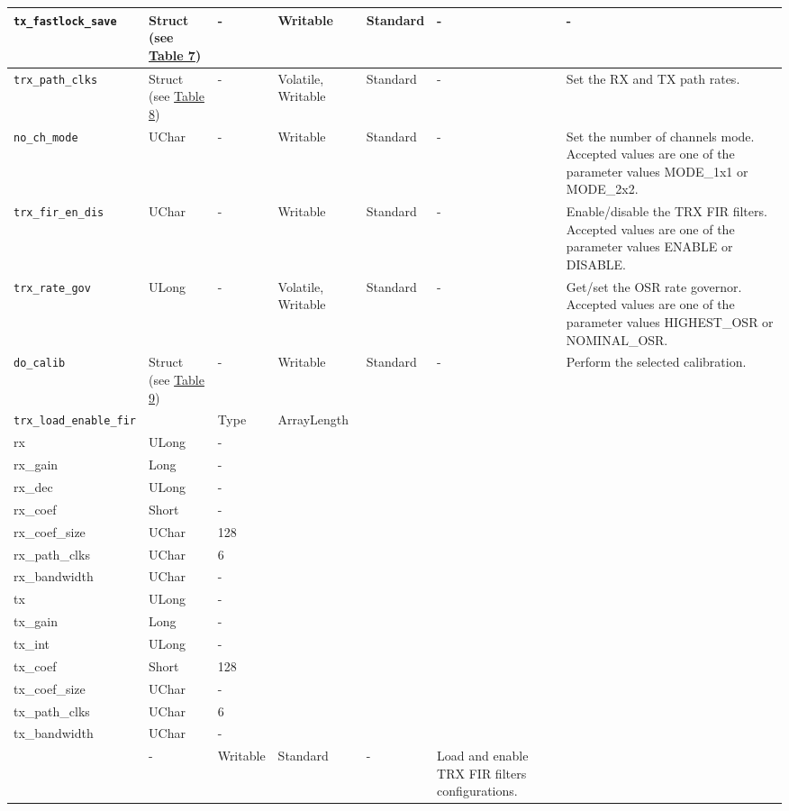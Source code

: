 \documentclass{article}
\begin{document}
\begin{landscape}
\begin{scriptsize}
\begin{longtable}{|p{3.6cm}|p{8.1cm}|p{1.4cm}|p{1.3cm}|p{1.4cm}|p{2.5cm}|p{3.6cm}|}
			\hline
			\verb+tx_fastlock_save+ & Struct (see \hyperlink{tab7}{Table 7}) & - & Writable & Standard & - & - \\
			\hline
			\verb+trx_path_clks+ & Struct (see \hyperlink{tab8}{Table 8}) & - & Volatile, Writable & Standard & - & Set the RX and TX path rates. \\
			\hline
			\verb+no_ch_mode+ & UChar & - & Writable & Standard & - & Set the number of channels mode. Accepted values are one of the parameter values MODE\_1x1 or MODE\_2x2. \\
			\hline
			\verb+trx_fir_en_dis+ & UChar & - & Writable & Standard & - & Enable/disable the TRX FIR filters. Accepted values are one of the parameter values ENABLE or DISABLE.\\
			\hline
			\verb+trx_rate_gov+ & ULong & - & Volatile, Writable & Standard & - & Get/set the OSR rate governor. Accepted values are one of the parameter values HIGHEST\_OSR or NOMINAL\_OSR. \\
			\hline
			\verb+do_calib+ & Struct (see \hyperlink{tab9}{Table 9})  & - & Writable & Standard & - & Perform the selected calibration. \\
			\hline
			\verb+trx_load_enable_fir+ & \begin{tabular}{|p{2.2cm}|p{2.7cm}|p{1.7cm}|} \hline \cellcolor{blue} Name & \cellcolor{blue}Type & \cellcolor{blue} ArrayLength \\ \hline rx & ULong & - \\ \hline rx\_gain & Long & - \\ \hline rx\_dec & ULong & - \\ \hline rx\_coef & Short & - \\ \hline rx\_coef\_size & UChar & 128 \\ \hline rx\_path\_clks & UChar & 6 \\ \hline rx\_bandwidth & UChar & - \\ \hline tx & ULong & - \\ \hline tx\_gain & Long & - \\ \hline tx\_int & ULong & - \\ \hline tx\_coef & Short & 128 \\ \hline tx\_coef\_size & UChar & - \\ \hline tx\_path\_clks & UChar & 6 \\ \hline tx\_bandwidth & UChar & - \\ \hline\end{tabular} & - & Writable & Standard & - & Load and enable TRX FIR filters configurations. \\

\end{longtable}
\end{scriptsize}
\end{landscape}
\end{document}
